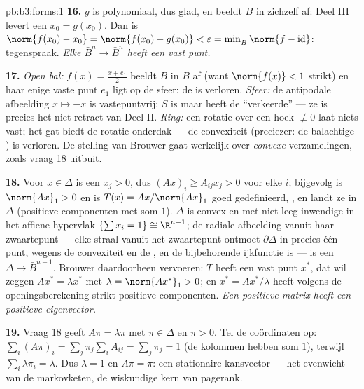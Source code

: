 \begin{solution}{pb:b3:forms:1}
\textbf{16.} $g$ is polynomiaal, dus glad, en beeldt $\bar B$ in
zichzelf af: Deel III levert een $x_0 = g(x_0)$. Dan is
$\norm{f(x_0) - x_0} = \norm{f(x_0) - g(x_0)} < \varepsilon =
\min_{\bar B}\norm{f - \operatorname{id}}$: tegenspraak.
\emph{Elke  $\bar B^n \to \bar B^n$ heeft een
vast punt.}

\textbf{17.} \emph{Open bal:} $f(x) = \frac{x + e_1}2$ beeldt $B$
in $B$ af (want $\norm{f(x)} < 1$ strikt) en haar enige vaste
punt $e_1$ ligt op de sfeer: de  is verloren.
\emph{Sfeer:} de antipodale afbeelding $x \mapsto -x$ is
vastepuntvrij; $S$ is  maar heeft de ``verkeerde''
 --- ze is precies het niet-retract van Deel II.
\emph{Ring:} een rotatie over een hoek $\not\equiv 0$ laat niets
vast; het gat biedt de rotatie onderdak --- de convexiteit
(preciezer: de balachtige ) is verloren. De stelling van
Brouwer gaat werkelijk over \emph{ convexe}
verzamelingen, zoals vraag 18 uitbuit.

\textbf{18.} Voor $x \in \Delta$ is een $x_j > 0$, dus $(Ax)_i
\geq A_{ij}x_j > 0$ voor elke $i$; bijgevolg is $\norm{Ax}_1 > 0$
en is $T(x) = Ax/\norm{Ax}_1$ goed gedefinieerd, , en
landt ze in $\Delta$ (positieve componenten met som $1$).
$\Delta$ is convex en  met niet-leeg inwendige in het
affiene hypervlak $\{\sum x_i = 1\} \cong \R^{n-1}$; de radiale
afbeelding vanuit haar zwaartepunt --- elke straal vanuit het
zwaartepunt ontmoet $\partial\Delta$ in precies één punt, wegens
de convexiteit en de , en de bijbehorende
ijkfunctie is  --- is een  $\Delta \to \bar
B^{n-1}$. Brouwer daardoorheen vervoeren: $T$ heeft een vast punt
$x^*$, dat wil zeggen $Ax^* = \lambda x^*$ met $\lambda =
\norm{Ax^*}_1 > 0$; en $x^* = Ax^*/\lambda$ heeft volgens de
openingsberekening strikt positieve componenten. \emph{Een
positieve matrix heeft een positieve eigenvector.}

\textbf{19.} Vraag 18 geeft $A\pi = \lambda\pi$ met $\pi \in
\Delta$ en $\pi > 0$. Tel de coördinaten op: $\sum_i(A\pi)_i =
\sum_j\pi_j\sum_iA_{ij} = \sum_j\pi_j = 1$ (de kolommen hebben
som $1$), terwijl $\sum_i\lambda\pi_i = \lambda$. Dus $\lambda =
1$ en $A\pi = \pi$: een stationaire kansvector --- het evenwicht
van de markovketen, de wiskundige kern van pagerank.


\end{solution}
